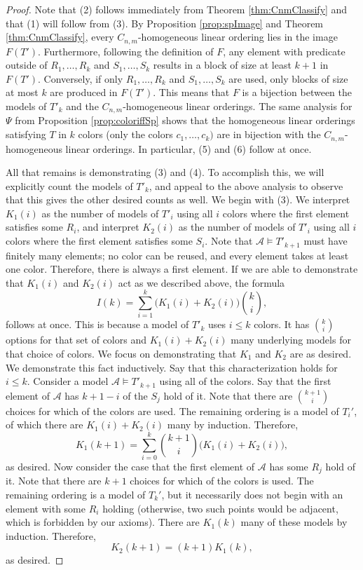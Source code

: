 \documentclass[10pt,a4paper]{amsart}
\def\A{\mathcal A}
\begin{document}
\begin{proof}
    Note that (2) follows immediately from Theorem \ref{thm:CnmClassify} and that (1) will follow from (3).
    By Proposition \ref{prop:spImage} and Theorem \ref{thm:CnmClassify}, every $C_{n,m}$-homogeneous linear ordering lies in the image $F(T')$.
    Furthermore, following the definition of $F$, any element with predicate outside of $R_1,\dots,R_k$ and $S_1,\dots,S_k$ results in a block of size at least $k+1$ in $F(T')$.
    Conversely, if only $R_1,\dots,R_k$ and $S_1,\dots,S_k$ are used, only blocks of size at most $k$ are produced in $F(T')$.
    This means that $F$ is a bijection between the models of $T'_k$ and the $C_{n,m}$-homogeneous linear orderings.
    The same analysis for $\Psi$ from Proposition \ref{prop:coloriffSp} shows that the homogeneous linear orderings satisfying $T$ in $k$ colors (only the colors $c_1,\dots,c_k)$ are in bijection with the $C_{n,m}$-homogeneous linear orderings.
    In particular, (5) and (6) follow at once.

    All that remains is demonstrating (3) and (4).
    To accomplish this, we will explicitly count the models of $T'_k$, and appeal to the above analysis to observe that this gives the other desired counts as well.
    We begin with (3).
    We interpret $K_1(i)$ as the number of models of $T'_i$ using all $i$ colors where the first element satisfies some $R_i$, and interpret $K_2(i)$ as the number of models of $T'_i$ using all $i$ colors where the first element satisfies some $S_i$.
    Note that $\A\models T'_{k+1}$ must have finitely many elements; no color can be reused, and every element takes at least one color.
    Therefore, there is always a first element.
    If we are able to demonstrate that $K_1(i)$ and $K_2(i)$ act as we described above, the formula
    \[I(k)=\sum_{i=1}^{k} \big(K_1(i)+K_2(i)\big) {k \choose i},\]
    follows at once.
    This is because a model of $T'_k$ uses $i\leq k$ colors.
    It has ${k \choose i}$ options for that set of colors and $K_1(i)+K_2(i)$ many underlying models for that choice of colors.
    We focus on demonstrating that $K_1$ and $K_2$ are as desired.
    We demonstrate this fact inductively.
    Say that this characterization holds for $i\leq k$.
    Consider a model $\A\models T'_{k+1}$ using all of the colors.
    Say that the first element of $\A$ has $k+1-i$ of the $S_j$ hold of it.
    Note that there are ${k+1 \choose i}$ choices for which of the colors are used.
    The remaining ordering is a model of $T_i'$, of which there are $K_1(i)+K_2(i)$ many by induction.
    Therefore,
    \[K_1(k+1)= \sum_{i=0}^{k} {k+1 \choose i} \big(K_1(i)+K_2(i)\big),\]
    as desired.
    Now consider the case that the first element of $\A$ has some $R_j$ hold of it.
    Note that there are $k+1$ choices for which of the colors is used.
    The remaining ordering is a model of $T_k'$, but it necessarily does not begin with an element with some $R_i$ holding (otherwise, two such points would be adjacent, which is forbidden by our axioms).
    There are $K_1(k)$ many of these models by induction.
    Therefore,
    \[K_2(k+1)=(k+1)K_1(k),\]
    as desired.


\end{proof}
\end{document}
